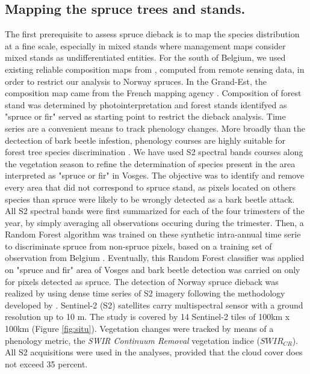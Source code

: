\documentclass[3p,procedia]{elsarticle}
\begin{document}
\subsection{Mapping the spruce trees and stands.}
The first prerequisite to assess spruce dieback is to map the species distribution at a fine scale, especially in mixed stands where management maps consider mixed stands as undifferentiated entities.
For the south of Belgium, we used existing reliable composition maps from \cite{bolyn_mapping_2022}, computed from remote sensing data, in order to restrict our analysis to Norway spruces.
In the Grand-Est, the composition map came from the French mapping agency \citep{IGN_bd_2018}. 
Composition of forest stand was determined by photointerpretation and forest stands identifyed as "spruce or fir" served as starting point to restrict the dieback analysis.
Time series are a convenient means to track phenology changes. 
More broadly than the dectection of bark beetle infestion, phenology courses are highly suitable for forest tree species discrimination \citep{lisein_discrimination_2015,grabska_forest_2019,ma_tree_2021}.
We have used S2 spectral bands courses along the vegetation season to refine the determination of species present in the area interpreted as "spruce or fir" in Vosges.
The objective was to identify and remove every area that did not correspond to spruce stand, as pixels located on others species than spruce were likely to be wrongly detected as a bark beetle attack.
All S2 spectral bands were first summarized for each of the four trimesters of the year, by simply averaging all observations occuring during the trimester.
Then, a Random Forest algorithm was trained on these synthetic intra-annual time serie to discriminate spruce from non-spruce pixels, based on a training set of observation from Belgium \citep{bolyn_forest_2018}.
Eventually, this Random Forest classifier was applied on "spruce and fir" area of Vosges and bark beetle detection was carried on only for pixels detected as spruce. 
The detection of Norway spruce dieback was realized by using dense time series of S2 imagery following the methodology developed by \cite{dutrieux_package_2021}.
Sentinel-2 (S2) satellites carry multispectral sensor with a ground resolution up to 10 m.
The study is covered by 14 Sentinel-2 tiles of 100km x 100km (Figure \ref{fig:situ}).  
Vegetation changes were tracked by means of a phenology metric, the \textit{SWIR Continuum Removal} vegetation indice ($SWIR_{CR}$).
All S2 acquisitions were used in the analyses, provided that the cloud cover does not exceed 35 percent. 
\end{document}
